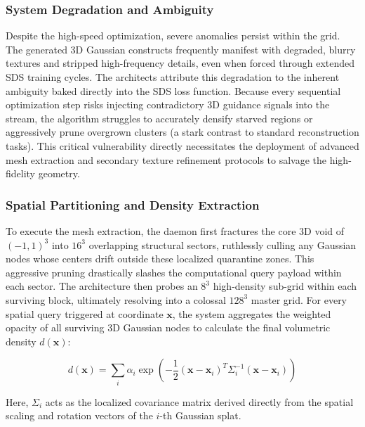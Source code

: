 \subsubsection{System Degradation and Ambiguity}
Despite the high-speed optimization, severe anomalies persist within the grid. The generated 3D Gaussian constructs frequently manifest with degraded, blurry textures and stripped high-frequency details, even when forced through extended SDS training cycles. The architects attribute this degradation to the inherent ambiguity baked directly into the SDS loss function. Because every sequential optimization step risks injecting contradictory 3D guidance signals into the stream, the algorithm struggles to accurately densify starved regions or aggressively prune overgrown clusters (a stark contrast to standard reconstruction tasks). This critical vulnerability directly necessitates the deployment of advanced mesh extraction and secondary texture refinement protocols to salvage the high-fidelity geometry.

\subsubsection{Spatial Partitioning and Density Extraction}
To execute the mesh extraction, the daemon first fractures the core 3D void of $(-1,1)^3$ into $16^3$ overlapping structural sectors, ruthlessly culling any Gaussian nodes whose centers drift outside these localized quarantine zones. This aggressive pruning drastically slashes the computational query payload within each sector. The architecture then probes an $8^3$ high-density sub-grid within each surviving block, ultimately resolving into a colossal $128^3$ master grid. For every spatial query triggered at coordinate $\mathbf{x}$, the system aggregates the weighted opacity of all surviving 3D Gaussian nodes to calculate the final volumetric density $d(\mathbf{x})$:

\begin{equation}
d(\mathbf{x}) = \sum_{i} \alpha_i \exp \left( -\frac{1}{2} (\mathbf{x} - \mathbf{x}_i)^T \Sigma_i^{-1} (\mathbf{x} - \mathbf{x}_i) \right)
\end{equation}

Here, $\Sigma_i$ acts as the localized covariance matrix derived directly from the spatial scaling and rotation vectors of the $i$-th Gaussian splat. 

